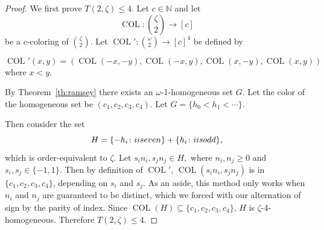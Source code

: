\documentclass[10pt,a4paper]{article}
\newcommand{\om}{\omega}
\newcommand{\setconcat}{+}
\newcommand{\COL}{\operatorname{COL}}
\newcommand{\N}{\mathbb{N}}
\newcommand{\numcolors}{c}
\theoremstyle{plain}
\theoremstyle{definition}
\begin{document}
\begin{proof}
We first prove $T(2,\zeta)\leq 4$. Let $\numcolors \in \N$ and let $$\COL\colon \binom{\zeta}{2}\to [\numcolors]$$
be a $\numcolors$-coloring of $\binom{\zeta}{2}$.
Let $\COL'\colon \binom{\omega}{2} \to [\numcolors]^4$ be defined by 

$$
\COL'(x,y) = (\COL(-x,-y), \COL(-x,y), \COL(x,-y), \COL(x,y))
$$ where $x < y.$

By Theorem~\ref{th:ramsey} there exists an $\om$-1-homogeneous set $G$. 
Let the color of the homogeneous set be $(c_1,c_2,c_3,c_4)$.
Let $G = \{h_0 < h_1 < \cdots \}$. 

Then consider the set $$H= \{-h_i \colon i \textnormal{ is even}\} \setconcat \{h_i \colon i \textnormal{ is odd}\},$$ which is order-equivalent to $\zeta$. Let $s_in_i, s_jn_j \in H,$ where $n_i,n_j\geq 0$ and $s_i,s_j \in \{-1,1\}$. Then by definition of $\COL'$, $\COL(s_in_i,s_jn_j)$ is in $\{c_1, c_2, c_3, c_4\}$, depending on $s_i$ and $s_j$. As an aside, this method only works when $n_i$ and $n_j$ are guaranteed to be distinct, which we forced with our alternation of sign by the parity of index.
Since $\COL(H)\subseteq \{c_1,c_2,c_3,c_4\}$, $H$ is $\zeta$-4-homogeneous.
Therefore $T(2,\zeta)\leq 4$.


\end{proof}
\end{document}
